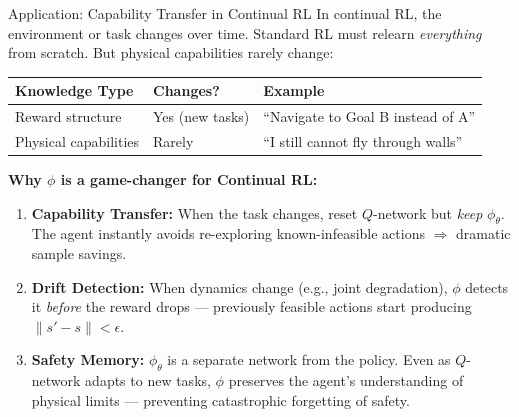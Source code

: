 \documentclass[11pt,aspectratio=169]{beamer}
\begin{document}
\begin{frame}{Application: Capability Transfer in Continual RL}
    In continual RL, the environment or task changes over time. Standard RL must relearn \textit{everything} from scratch. But physical capabilities rarely change:

    \vspace{0.2cm}
    \begin{table}[h]
    \centering
    \small
    \begin{tabular}{p{4cm}p{2.5cm}p{5.5cm}}
        \toprule
        \textbf{Knowledge Type} & \textbf{Changes?} & \textbf{Example} \\
        \midrule
        Reward structure & Yes (new tasks) & ``Navigate to Goal B instead of A'' \\
        Physical capabilities & Rarely & ``I still cannot fly through walls'' \\
        \bottomrule
    \end{tabular}
    \end{table}

    \textbf{Why $\phi$ is a game-changer for Continual RL:}
    \begin{enumerate}
        \item \textbf{Capability Transfer:} When the task changes, reset $Q$-network but \textit{keep} $\phi_\theta$. The agent instantly avoids re-exploring known-infeasible actions $\Rightarrow$ dramatic sample savings.
        \item \textbf{Drift Detection:} When dynamics change (e.g., joint degradation), $\phi$ detects it \textit{before} the reward drops — previously feasible actions start producing $\|s'-s\| < \epsilon$.
        \item \textbf{Safety Memory:} $\phi_\theta$ is a separate network from the policy. Even as $Q$-network adapts to new tasks, $\phi$ preserves the agent's understanding of physical limits — preventing catastrophic forgetting of safety.
    \end{enumerate}
\end{frame}
\end{document}
